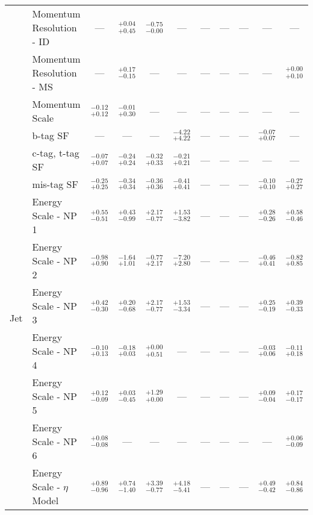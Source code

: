 \begin{tabular}{|cl||ccccccc|c||c|}
\cline{2-11}
&Momentum Resolution - ID & --- &  $^{+0.04}_{+0.45}$  &  $^{-0.75}_{-0.00}$  & --- & --- & --- & --- & --- & ---\\ 
\cline{2-11}
&Momentum Resolution - MS & --- &  $^{+0.17}_{-0.15}$  & --- & --- & --- & --- & --- & --- &  $^{+0.00}_{+0.10}$ \\ 
\cline{2-11}
&Momentum Scale &  $^{-0.12}_{+0.12}$  &  $^{-0.01}_{+0.30}$  & --- & --- & --- & --- & --- & --- & ---\\ 
\hline
\multirow{22}{*}{Jet}
&b-tag SF & --- & --- & --- &  $^{-4.22}_{+4.22}$  & --- & --- & --- &  $^{-0.07}_{+0.07}$  & ---\\ 
\cline{2-11}
&c-tag, t-tag SF &  $^{-0.07}_{+0.07}$  &  $^{-0.24}_{+0.24}$  &  $^{-0.32}_{+0.33}$  &  $^{-0.21}_{+0.21}$  & --- & --- & --- & --- & ---\\ 
\cline{2-11}
&mis-tag SF &  $^{-0.25}_{+0.25}$  &  $^{-0.34}_{+0.34}$  &  $^{-0.36}_{+0.36}$  &  $^{-0.41}_{+0.41}$  & --- & --- & --- &  $^{-0.10}_{+0.10}$  &  $^{-0.27}_{+0.27}$ \\ 
\cline{2-11}
&Energy Scale - NP 1 &  $^{+0.55}_{-0.51}$  &  $^{+0.43}_{-0.99}$  &  $^{+2.17}_{-0.77}$  &  $^{+1.53}_{-3.82}$  & --- & --- & --- &  $^{+0.28}_{-0.26}$  &  $^{+0.58}_{-0.46}$ \\ 
\cline{2-11}
&Energy Scale - NP 2 &  $^{-0.98}_{+0.90}$  &  $^{-1.64}_{+1.01}$  &  $^{-0.77}_{+2.17}$  &  $^{-7.20}_{+2.80}$  & --- & --- & --- &  $^{-0.46}_{+0.41}$  &  $^{-0.82}_{+0.85}$ \\ 
\cline{2-11}
&Energy Scale - NP 3 &  $^{+0.42}_{-0.30}$  &  $^{+0.20}_{-0.68}$  &  $^{+2.17}_{-0.77}$  &  $^{+1.53}_{-3.34}$  & --- & --- & --- &  $^{+0.25}_{-0.19}$  &  $^{+0.39}_{-0.33}$ \\ 
\cline{2-11}
&Energy Scale - NP 4 &  $^{-0.10}_{+0.13}$  &  $^{-0.18}_{+0.03}$  &  $^{+0.00}_{+0.51}$  & --- & --- & --- & --- &  $^{-0.03}_{+0.06}$  &  $^{-0.11}_{+0.18}$ \\ 
\cline{2-11}
&Energy Scale - NP 5 &  $^{+0.12}_{-0.09}$  &  $^{+0.03}_{-0.45}$  &  $^{+1.29}_{+0.00}$  & --- & --- & --- & --- &  $^{+0.09}_{-0.04}$  &  $^{+0.17}_{-0.17}$ \\ 
\cline{2-11}
&Energy Scale - NP 6 &  $^{+0.08}_{-0.08}$  & --- & --- & --- & --- & --- & --- & --- &  $^{+0.06}_{-0.09}$ \\ 
\cline{2-11}
&Energy Scale - $\eta$ Model &  $^{+0.89}_{-0.96}$  &  $^{+0.74}_{-1.40}$  &  $^{+3.39}_{-0.77}$  &  $^{+4.18}_{-5.41}$  & --- & --- & --- &  $^{+0.49}_{-0.42}$  &  $^{+0.84}_{-0.86}$ \\ 

\end{tabular}
